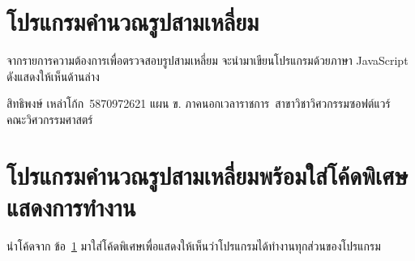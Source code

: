 \documentclass[12pt,a4paper]{article}
\newcommand{\sitdhibong}{สิทธิพงษ์ เหล่าโก้ก}
\newcommand{\studentid}{5870972621}
\newcommand{\department}{สาขาวิชาวิศวกรรมซอฟต์แวร์}
\newcommand{\faculty}{คณะวิศวกรรมศาสตร์}
\newcommand{\myprogram}{แผน ข. ภาคนอกเวลาราชการ}
\newcommand{\numbername}{ข้อ}
\begin{document}
% 
% 
% 
\section[โปรแกรมคำนวณรูปสามเหลี่ยม]{โปรแกรมคำนวณรูปสามเหลี่ยม}
\label{sec:trianglecal}
จากรายการความต้องการเพื่อตรวจสอบรูปสามเหลี่ยม จะนำมาเขียนโปรแกรมด้วยภาษา JavaScript ดังแสดงให้เห็นด้านล่าง


\vfill
\noindent\sitdhibong\, \studentid \newline
\myprogram\, \newline
\department\, \faculty

\newpage
\clearpage
\section[โปรแกรมคำนวณรูปสามเหลี่ยมใส่คำอธิบาย]{โปรแกรมคำนวณรูปสามเหลี่ยมพร้อมใส่โค้ดพิเศษแสดงการทำงาน}
\label{sec:trianglecalinstrumented}
นำโค้ดจาก \numbername~\ref{sec:trianglecal} มาใส่โค้ดพิเศษเพื่อแสดงให้เห็นว่าโปรแกรมได้ทำงานทุกส่วนของโปรแกรม

\end{document}
